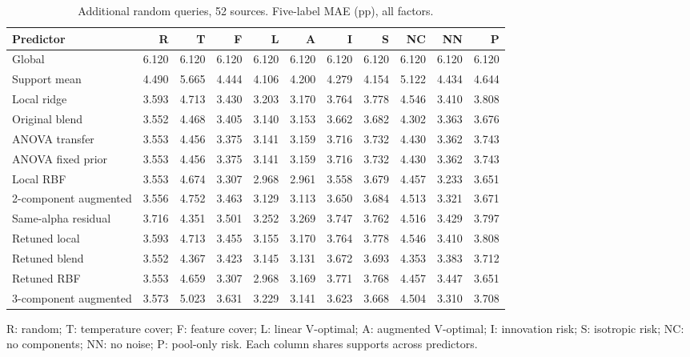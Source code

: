 \documentclass[11pt]{article}
\begin{document}
\clearpage\begin{landscape}\begin{table}[htbp]\centering\small
\caption{Additional random queries, 52 sources. Five-label MAE (pp), all factors.}
\begin{tabular}{lrrrrrrrrrr}\toprule Predictor & R & T & F & L & A & I & S & NC & NN & P\\\midrule
Global & 6.120 & 6.120 & 6.120 & 6.120 & 6.120 & 6.120 & 6.120 & 6.120 & 6.120 & 6.120\\
Support mean & 4.490 & 5.665 & 4.444 & 4.106 & 4.200 & 4.279 & 4.154 & 5.122 & 4.434 & 4.644\\
Local ridge & 3.593 & 4.713 & 3.430 & 3.203 & 3.170 & 3.764 & 3.778 & 4.546 & 3.410 & 3.808\\
Original blend & 3.552 & 4.468 & 3.405 & 3.140 & 3.153 & 3.662 & 3.682 & 4.302 & 3.363 & 3.676\\
ANOVA transfer & 3.553 & 4.456 & 3.375 & 3.141 & 3.159 & 3.716 & 3.732 & 4.430 & 3.362 & 3.743\\
ANOVA fixed prior & 3.553 & 4.456 & 3.375 & 3.141 & 3.159 & 3.716 & 3.732 & 4.430 & 3.362 & 3.743\\
Local RBF & 3.553 & 4.674 & 3.307 & 2.968 & 2.961 & 3.558 & 3.679 & 4.457 & 3.233 & 3.651\\
2-component augmented & 3.556 & 4.752 & 3.463 & 3.129 & 3.113 & 3.650 & 3.684 & 4.513 & 3.321 & 3.671\\
Same-alpha residual & 3.716 & 4.351 & 3.501 & 3.252 & 3.269 & 3.747 & 3.762 & 4.516 & 3.429 & 3.797\\
Retuned local & 3.593 & 4.713 & 3.455 & 3.155 & 3.170 & 3.764 & 3.778 & 4.546 & 3.410 & 3.808\\
Retuned blend & 3.552 & 4.367 & 3.423 & 3.145 & 3.131 & 3.672 & 3.693 & 4.353 & 3.383 & 3.712\\
Retuned RBF & 3.553 & 4.659 & 3.307 & 2.968 & 3.169 & 3.771 & 3.768 & 4.457 & 3.447 & 3.651\\
3-component augmented & 3.573 & 5.023 & 3.631 & 3.229 & 3.141 & 3.623 & 3.668 & 4.504 & 3.310 & 3.708\\
\bottomrule\end{tabular}\par\medskip\footnotesize R: random; T: temperature cover; F: feature cover; L: linear V-optimal; A: augmented V-optimal; I: innovation risk; S: isotropic risk; NC: no components; NN: no noise; P: pool-only risk. Each column shares supports across predictors.\end{table}\end{landscape}
\end{document}
